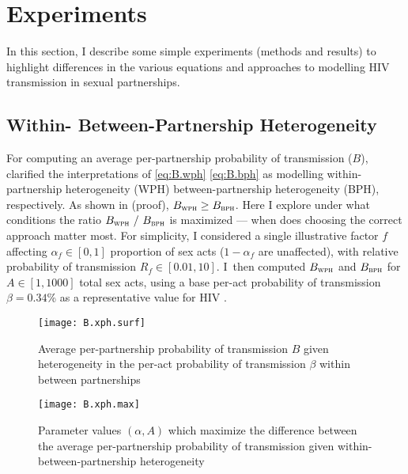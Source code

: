 \section{Experiments}\label{foi.exp}
In this section, I describe some simple experiments (methods and results) to
highlight differences in the various equations and approaches
to modelling HIV transmission in sexual partnerships.
\subsection{Within- \vs Between-Partnership Heterogeneity}\label{foi.exp.xph}
For computing an average per-partnership probability of transmission ($B$),
 clarified the interpretations of
\eqref{eq:B.wph} \vs \eqref{eq:B.bph} as modelling
within-partnership heterogeneity (WPH) \vs between-partnership heterogeneity (BPH), respectively.
As shown in  (proof), $B_{\textsc{wph}} \ge B_{\textsc{bph}}$.
Here I explore under what conditions the ratio $B_{\textsc{wph}}~/~B_{\textsc{bph}}$ is maximized
--- \ie when does choosing the correct approach matter most.
For simplicity, I considered a single illustrative factor $f$
affecting $\alpha_f \in [0,1]$ proportion of sex acts ($1-\alpha_f$ are unaffected),
with relative probability of transmission $R_f \in [0.01,10]$.
I~then computed $B_{\textsc{wph}}$ and $B_{\textsc{bph}}$ for $A \in [1,1000]$ total sex acts,
using a base per-act probability of transmission $\beta = 0.34$\%
as a representative value for HIV \cite{Boily2009}.
\par
\begin{figure}
  \centering\texttt{[image: B.xph.surf]}
  \caption{Average per-partnership probability of transmission $B$
    given heterogeneity in the per-act probability of transmission $\beta$
    within \vs between partnerships}
  \label{fig:B.xph.surf}
\end{figure}
\begin{figure}
  \centering\texttt{[image: B.xph.max]}
  \caption{Parameter values $(\alpha,A)$ which maximize the difference between
    the average per-partnership probability of transmission
    given within- \vs between-partnership heterogeneity}
  \label{fig:B.xph.max}
\end{figure}
